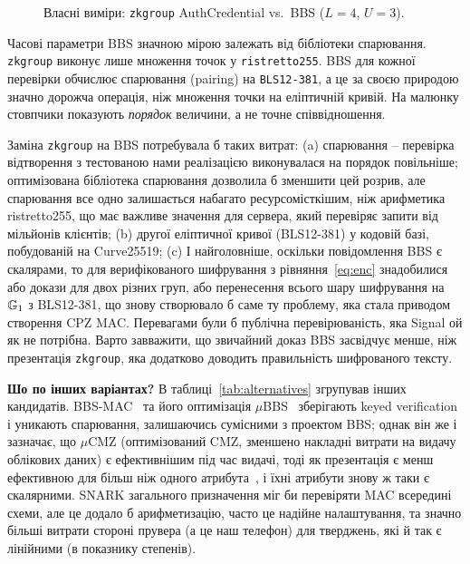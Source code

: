 \begin{figure}[!ht]
  \centering
  \begin{minipage}{0.75\linewidth}
    \centering
    
    \caption{Власні виміри: \texttt{zkgroup} AuthCredential vs.\ BBS ($L=4$, $U=3$).}
    \label{fig:bench}
  \end{minipage}
\end{figure}
Часові параметри BBS значною мірою залежать від бібліотеки спарювання. \texttt{zkgroup} виконує лише множення 
точок у \texttt{ristretto255}. BBS для кожної перевірки обчислює спарювання (pairing) на \texttt{BLS12-381}, а 
це за своєю природою значно дорожча операція, ніж множення точки на еліптичній кривій. На малюнку стовпчики 
показують \textit{порядок} величини, а не точне співвідношення.

Заміна \texttt{zkgroup} на BBS потребувала б таких витрат: (a) спарювання -- перевірка відтворення з тестованою 
нами реалізацією виконувалася на порядок повільніше; оптимізована бібліотека спарювання дозволила б зменшити цей 
розрив, але спарювання все одно залишається набагато ресурсомісткішим, ніж арифметика ristretto255, що має важливе 
значення для сервера, який перевіряє запити від мільйонів клієнтів; (b) другої еліптичної кривої (BLS12-381) у 
кодовій базі, побудованій на Curve25519; (c) І найголовніше, оскільки повідомлення BBS є скалярами, то для 
верифікованого шифрування з рівняння~\ref{eq:enc} знадобилися або докази для двох різних груп, або перенесення 
всього шару шифрування на $\mathbb{G}_1$ з BLS12-381, що знову створювало б саме ту проблему, яка стала приводом створення 
CPZ MAC. Перевагами були б публічна перевірюваність, яка Signal ой як не потрібна. Варто завважити, що звичайний 
доказ BBS засвідчує менше, ніж презентація \texttt{zkgroup}, яка додатково доводить правильність шифрованого тексту.

\textbf{Шо по інших варіантах?} В таблиці~\ref{tab:alternatives} згрупував інших кандидатів. BBS-MAC~\cite{BBDT16} 
та його оптимізація $\mu$BBS~\cite{Orru24} зберігають keyed verification і уникають спарювання, залишаючись 
сумісними з проектом BBS; однак він же і зазначає, що $\mu$CMZ (оптимізований CMZ, зменшено накладні 
витрати на видачу облікових даних) є ефективнішим під час видачі, тоді як презентація є менш ефективною для більш 
ніж одного атрибута~\cite{Orru24}, і їхні атрибути знову ж таки є скалярними. SNARK загального призначення міг би 
перевіряти MAC всередині схеми, але це додало б арифметизацію, часто це надійне налаштування, та значно більші 
витрати стороні прувера (а це наш телефон) для тверджень, які й так є лінійними (в показнику степенів).

